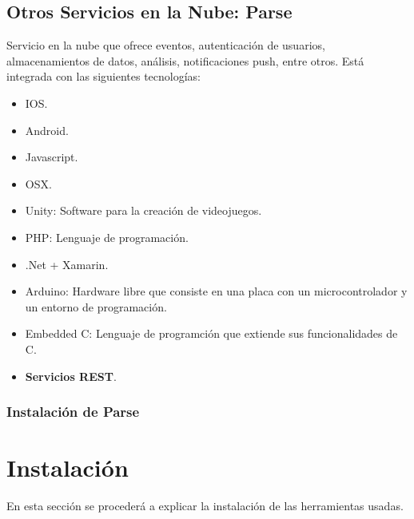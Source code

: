 	\subsection{Otros Servicios en la Nube: Parse\cite{16:parse:online}}
	Servicio en la nube que ofrece eventos, autenticación de usuarios, almacenamientos de datos, análisis, notificaciones push, entre otros.
	Está integrada con las siguientes tecnologías:
	\begin{itemize}
		\item IOS\cite{10:ios:online}.
		\item Android\cite{2:android:online}.
		\item Javascript\cite{22:javascript:online}.
		\item OSX\cite{23:osx:online}.
		\item Unity\cite{24:unity:online}: Software para la creación de videojuegos.
		\item PHP\cite{25:php:online}: Lenguaje de programación.
		\item .Net + Xamarin.
		\item Arduino\cite{26:arduino:online}: Hardware libre que consiste en una placa con un microcontrolador y un entorno de programación.
		\item Embedded C: Lenguaje de programción que extiende sus funcionalidades de C\cite{28:c:online}.
		\item {\bf Servicios REST}\cite{11:rest:online}.
	\end{itemize}
	
	\subsubsection{Instalación de Parse}
	
\section{Instalación}
	En esta sección se procederá a explicar la instalación de las herramientas usadas.

